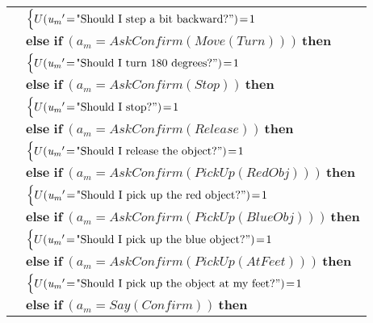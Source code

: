 \begin{footnotesize}
\begin{longtable}{p{2cm}l}
& \;\;\;\;\; $ \begin{cases}U(\mathit{u_m}'\!=\!\text{"Should I step a bit backward?}")\!=\!1 \end{cases}$ \vspace{1mm} \\ & $ \textbf{else if} \ (\mathit{a_m}\!=\!\mathit{AskConfirm(Move(Turn))}) \ \textbf{then}$ \\
& \;\;\;\;\; $ \begin{cases}U(\mathit{u_m}'\!=\!\text{"Should I turn 180 degrees?}")\!=\!1 \end{cases}$ \vspace{1mm} \\ & $ \textbf{else if} \ (\mathit{a_m}\!=\!\mathit{AskConfirm(Stop)}) \ \textbf{then}$ \\
& \;\;\;\;\; $ \begin{cases}U(\mathit{u_m}'\!=\!\text{"Should I stop?}")\!=\!1 \end{cases}$ \vspace{1mm} \\ & $ \textbf{else if} \ (\mathit{a_m}\!=\!\mathit{AskConfirm(Release)}) \ \textbf{then}$ \\
& \;\;\;\;\; $ \begin{cases}U(\mathit{u_m}'\!=\!\text{"Should I release the object?}")\!=\!1 \end{cases}$ \vspace{1mm} \\ & $ \textbf{else if} \ (\mathit{a_m}\!=\!\mathit{AskConfirm(PickUp(RedObj))}) \ \textbf{then}$ \\
& \;\;\;\;\; $ \begin{cases}U(\mathit{u_m}'\!=\!\text{"Should I pick up the red object?}")\!=\!1 \end{cases}$ \vspace{1mm} \\ & $ \textbf{else if} \ (\mathit{a_m}\!=\!\mathit{AskConfirm(PickUp(BlueObj))}) \ \textbf{then}$ \\
& \;\;\;\;\; $ \begin{cases}U(\mathit{u_m}'\!=\!\text{"Should I pick up the blue object?}")\!=\!1 \end{cases}$ \vspace{1mm} \\ & $ \textbf{else if} \ (\mathit{a_m}\!=\!\mathit{AskConfirm(PickUp(AtFeet))}) \ \textbf{then}$ \\
& \;\;\;\;\; $ \begin{cases}U(\mathit{u_m}'\!=\!\text{"Should I pick up the object at my feet?}")\!=\!1 \end{cases}$ \vspace{1mm} \\ & $ \textbf{else if} \ (\mathit{a_m}\!=\!\mathit{Say(Confirm)}) \ \textbf{then}$ \\

\end{longtable}
\end{footnotesize}
